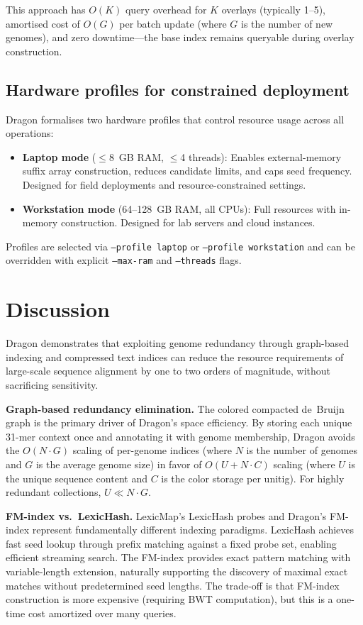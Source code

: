 \documentclass[11pt]{article}
\begin{document}
This approach has $O(K)$ query overhead for $K$ overlays (typically 1--5), amortised cost of $O(G)$ per batch update (where $G$ is the number of new genomes), and zero downtime---the base index remains queryable during overlay construction.

\subsection{Hardware profiles for constrained deployment}

Dragon formalises two hardware profiles that control resource usage across all operations:
\begin{itemize}
    \item \textbf{Laptop mode} ($\leq$8~GB RAM, $\leq$4 threads): Enables external-memory suffix array construction, reduces candidate limits, and caps seed frequency. Designed for field deployments and resource-constrained settings.
    \item \textbf{Workstation mode} (64--128~GB RAM, all CPUs): Full resources with in-memory construction. Designed for lab servers and cloud instances.
\end{itemize}
Profiles are selected via \texttt{--profile laptop} or \texttt{--profile workstation} and can be overridden with explicit \texttt{--max-ram} and \texttt{--threads} flags.

\section{Discussion}

Dragon demonstrates that exploiting genome redundancy through graph-based indexing and compressed text indices can reduce the resource requirements of large-scale sequence alignment by one to two orders of magnitude, without sacrificing sensitivity.

\textbf{Graph-based redundancy elimination.} The colored compacted de~Bruijn graph is the primary driver of Dragon's space efficiency. By storing each unique 31-mer context once and annotating it with genome membership, Dragon avoids the $O(N \cdot G)$ scaling of per-genome indices (where $N$ is the number of genomes and $G$ is the average genome size) in favor of $O(U + N \cdot C)$ scaling (where $U$ is the unique sequence content and $C$ is the color storage per unitig). For highly redundant collections, $U \ll N \cdot G$.

\textbf{FM-index vs.\ LexicHash.} LexicMap's LexicHash probes and Dragon's FM-index represent fundamentally different indexing paradigms. LexicHash achieves fast seed lookup through prefix matching against a fixed probe set, enabling efficient streaming search. The FM-index provides exact pattern matching with variable-length extension, naturally supporting the discovery of maximal exact matches without predetermined seed lengths. The trade-off is that FM-index construction is more expensive (requiring BWT computation), but this is a one-time cost amortized over many queries.
\end{document}
